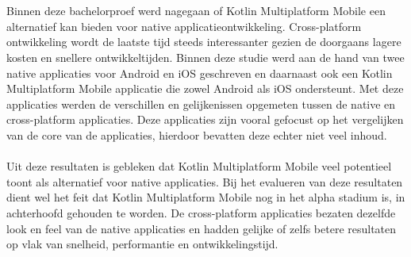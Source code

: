 
%
%

%



\chapter*{}

Binnen deze bachelorproef werd nagegaan of Kotlin Multiplatform Mobile een alternatief kan bieden voor native applicatieontwikkeling. Cross-platform ontwikkeling wordt de laatste tijd steeds interessanter gezien de doorgaans lagere kosten en snellere ontwikkeltijden. Binnen deze studie werd aan de hand van twee native applicaties voor Android en iOS geschreven en daarnaast ook een Kotlin Multiplatform Mobile applicatie die zowel Android als iOS ondersteunt. Met deze applicaties werden de verschillen en gelijkenissen opgemeten tussen de native en cross-platform applicaties. Deze applicaties zijn vooral gefocust op het vergelijken van de core van de applicaties, hierdoor bevatten deze echter niet veel inhoud. 
\\ \\
Uit deze resultaten is gebleken dat Kotlin Multiplatform Mobile veel potentieel toont als alternatief voor native applicaties. Bij het evalueren van deze resultaten dient wel het feit dat Kotlin Multiplatform Mobile nog in het alpha stadium is, in achterhoofd gehouden te worden. De cross-platform applicaties bezaten dezelfde look en feel van de native applicaties en hadden gelijke of zelfs betere resultaten op vlak van snelheid, performantie en ontwikkelingstijd. 
\\ \\
